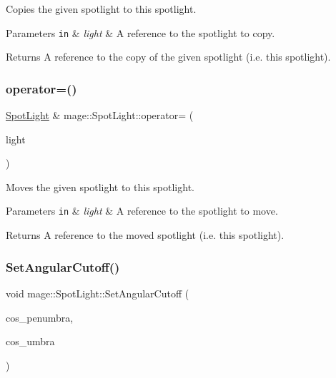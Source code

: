 Copies the given spotlight to this spotlight.


\begin{DoxyParams}[1]{Parameters}
\mbox{\tt in}  & {\em light} & A reference to the spotlight to copy. \\
\hline
\end{DoxyParams}
\begin{DoxyReturn}{Returns}
A reference to the copy of the given spotlight (i.\+e. this spotlight). 
\end{DoxyReturn}
\hypertarget{classmage_1_1_spot_light_ab79e4bf1c488c1a753f434a4d84567e5}{}\label{classmage_1_1_spot_light_ab79e4bf1c488c1a753f434a4d84567e5} 
\subsubsection{\texorpdfstring{operator=()}{operator=()}\hspace{0.1cm}{\footnotesize\ttfamily [2/2]}}
{\footnotesize\ttfamily \hyperlink{classmage_1_1_spot_light}{Spot\+Light} \& mage\+::\+Spot\+Light\+::operator= (\begin{DoxyParamCaption}\item[{\hyperlink{classmage_1_1_spot_light}{Spot\+Light} \&\&}]{light }\end{DoxyParamCaption})\hspace{0.3cm}{\ttfamily [default]}}

Moves the given spotlight to this spotlight.


\begin{DoxyParams}[1]{Parameters}
\mbox{\tt in}  & {\em light} & A reference to the spotlight to move. \\
\hline
\end{DoxyParams}
\begin{DoxyReturn}{Returns}
A reference to the moved spotlight (i.\+e. this spotlight). 
\end{DoxyReturn}
\hypertarget{classmage_1_1_spot_light_a51bdd2f7294982f9a7e74aef6b19c461}{}\label{classmage_1_1_spot_light_a51bdd2f7294982f9a7e74aef6b19c461} 
\subsubsection{\texorpdfstring{Set\+Angular\+Cutoff()}{SetAngularCutoff()}}
{\footnotesize\ttfamily void mage\+::\+Spot\+Light\+::\+Set\+Angular\+Cutoff (\begin{DoxyParamCaption}\item[{float}]{cos\+\_\+penumbra,  }\item[{float}]{cos\+\_\+umbra }\end{DoxyParamCaption})\hspace{0.3cm}{\ttfamily [noexcept]}}

